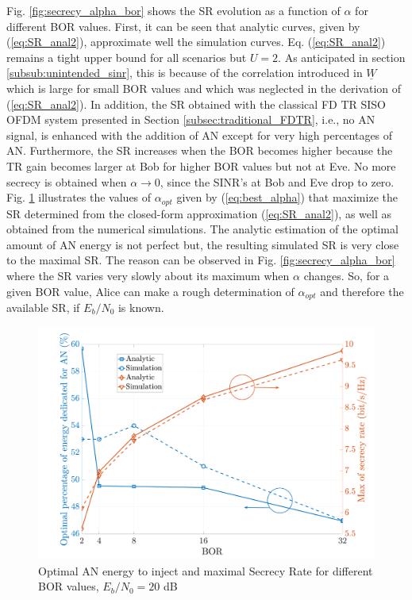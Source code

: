 \documentclass[conference]{IEEEtran}
\begin{document}
Fig. \ref{fig:secrecy_alpha_bor} shows the SR evolution as a function of $\alpha$ for different BOR values. First, it can be seen that analytic curves, given by (\ref{eq:SR_anal2}), approximate well the simulation curves. Eq. (\ref{eq:SR_anal2}) remains a tight upper bound for all scenarios but $U=2$. As anticipated in section \ref{subsub:unintended_sinr}, this is because of the correlation introduced in $\underline{W}$ which is large for small BOR values and which was neglected in the derivation of (\ref{eq:SR_anal2}). In addition, the SR obtained with the classical FD TR SISO OFDM system presented in Section \ref{subsec:traditional_FDTR}, i.e., no AN signal, is enhanced with the addition of AN except for very high percentages of AN. Furthermore, the SR increases when the BOR becomes higher because the TR gain becomes larger at Bob for higher BOR values but not at Eve. No more secrecy is obtained when $\alpha \to 0$, since the SINR's at Bob and Eve drop to zero.\\
Fig. \ref{fig:secrecy_alpha_bor_optimal} illustrates the values of $\alpha_{opt}$ given by (\ref{eq:best_alpha}) that maximize the SR determined from the closed-form approximation (\ref{eq:SR_anal2}), as well as obtained from the numerical simulations. The analytic estimation of the optimal amount of AN energy is not perfect but, the resulting simulated SR is very close to the maximal SR. The reason can be observed in Fig. \ref{fig:secrecy_alpha_bor} where the SR varies very slowly about its maximum when $\alpha$ changes. So, for a given BOR value, Alice can make a rough determination of $\alpha_{opt}$ and therefore the available SR, if $E_b/N_0$ is known.  



\begin{figure}[t]
    \centering
    \centerline{\includegraphics[width = .37\textwidth]{img/final_optimal_alpha.pdf}}
    \caption{Optimal AN energy to inject and maximal Secrecy Rate for different BOR values, $E_b/N_0=20$ dB}
    \label{fig:secrecy_alpha_bor_optimal}
\end{figure}
\end{document}
